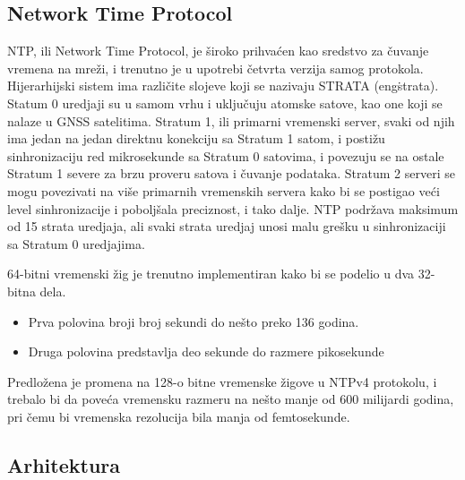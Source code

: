 \documentclass[a4paper,12pt, master]{etf}
\begin{document}
	\subsection{Network Time Protocol}

	NTP, ili Network Time Protocol, je \v{s}iroko prihva\'{c}en kao sredstvo za
	\v{c}uvanje vremena na mre\v{z}i, i trenutno je u upotrebi \v{c}etvrta
	verzija samog protokola. Hijerarhijski sistem ima razli\v{c}ite slojeve
	koji se nazivaju STRATA (eng\. strata). Statum 0 uredjaji su u samom vrhu i
	uklju\v{c}uju atomske satove, kao one koji se nalaze u GNSS	satelitima.
	Stratum 1, ili primarni vremenski server, svaki od njih ima jedan na jedan
	direktnu konekciju sa Stratum 1 satom, i posti\v{z}u sinhronizaciju red
	mikrosekunde sa Stratum	0 satovima, i povezuju se na ostale Stratum 1
	severe za brzu proveru satova i \v{c}uvanje	podataka. Stratum 2 serveri se
	mogu povezivati na vi\v{s}e primarnih vremenskih servera kako bi se
	postigao ve\'{c}i level sinhronizacije i pobolj\v{s}ala preciznost, i tako
	dalje. NTP podr\v{z}ava maksimum od 15 strata uredjaja, ali svaki strata
	uredjaj unosi malu gre\v{s}ku u	sinhronizaciji sa Stratum 0 uredjajima.

	64-bitni vremenski \v{z}ig je trenutno implementiran kako bi se podelio u
	dva 32-bitna dela.
	\begin{itemize}
		\item Prva polovina broji broj sekundi do ne\v{s}to preko 136 godina.
		\item Druga polovina predstavlja deo sekunde do razmere pikosekunde
	\end{itemize}

	Predlo\v{z}ena je promena na 128-o bitne vremenske \v{z}igove u NTPv4
	protokolu, i trebalo bi da pove\'{c}a vremensku razmeru na ne\v{s}to manje
	od 600 milijardi godina, pri \v{c}emu bi vremenska rezolucija bila manja od
	femtosekunde.

    \subsection{Arhitektura}
\end{document}
